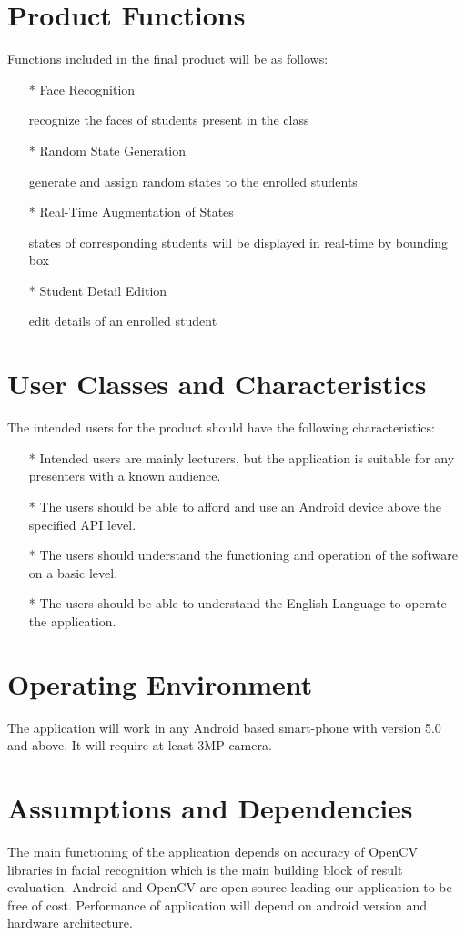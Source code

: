 \section{Product Functions}
Functions included in the final product will be as follows:
\begin{itemize}

\item[*]
Face Recognition

\quad recognize the faces of students present in the class
\item[*]
Random State Generation

\quad generate and assign random states to the enrolled students
\item[*]
Real-Time Augmentation of States

\quad states of corresponding students will be displayed in real-time by bounding box
\item[*]
Student Detail Edition

\quad edit details of an enrolled student

\end{itemize}


\section{User Classes and Characteristics}
The intended users for the product should have the following characteristics:
\begin{itemize}
\item[*]
Intended users are mainly lecturers, but the application is suitable for
any presenters with a known audience.
\item[*]
The users should be able to afford and use an Android device above the specified API level.
\item[*]
The users should understand the functioning and operation of the software on a basic level.
\item[*]
The users should be able to understand the English Language to operate the application.
\end{itemize}

\section{Operating Environment}
The application will work in any Android based smart-phone with version 5.0 and above. It will require at least 3MP camera.

\section{Assumptions and Dependencies}
The main functioning of the application depends on accuracy of OpenCV
libraries in facial recognition which is the main building block of
result evaluation. Android and OpenCV are open source leading our
application to be free of cost. Performance of application will depend
on android version and hardware architecture.

